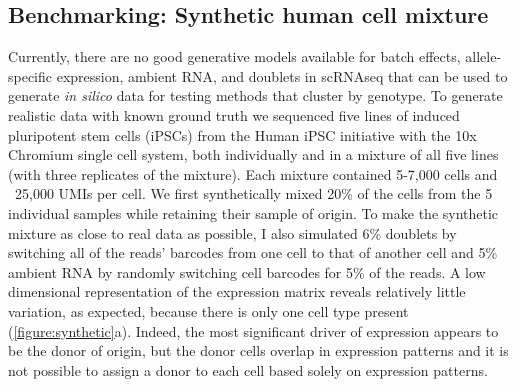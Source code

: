 \subsection{Benchmarking: Synthetic human cell mixture}

Currently, there are no good generative models available for batch effects, allele-specific expression, ambient RNA, and doublets in scRNAseq that can be used to generate \textit{in silico} data for testing methods that cluster by genotype. To generate realistic data with known ground truth we sequenced five lines of induced pluripotent stem cells (iPSCs) from the Human iPSC initiative\cite{hipsci} with the 10x Chromium single cell system, both individually and in a mixture of all five lines (with three replicates of the mixture). Each mixture contained 5-7,000 cells and ~25,000 UMIs per cell. We first synthetically mixed 20\% of the cells from the 5 individual samples while retaining their sample of origin. To make the synthetic mixture as close to real data as possible, I also simulated 6\% doublets by switching all of the reads' barcodes from one cell to that of another cell and 5\% ambient RNA by randomly switching cell barcodes for 5\% of the reads. A low dimensional representation of the expression matrix reveals relatively little variation, as expected, because there is only one cell type present (\ref{figure:synthetic}a). Indeed, the most significant driver of expression appears to be the donor of origin, but the donor cells overlap in expression patterns and it is not possible to assign a donor to each cell based solely on expression patterns.



